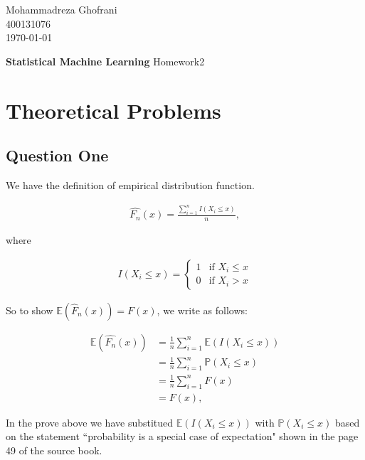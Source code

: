 \documentclass[12pt, a4paper]{book}
\newcommand{\coursetitle}{Statistical Machine Learning}
\newcommand{\doctitle}{Homework2}
\newcommand{\name}{Mohammadreza Ghofrani}
\newcommand{\studentno}{400131076}
\newcommand{\todaydate}{\today}
\begin{document}
\begin{flushright}
    \name \\
    \studentno \\
    \todaydate
\end{flushright}

\vspace*{0.5cm}

\begin{center}
    \huge
    \textbf{\coursetitle}
    \break
    \large
    \doctitle
\end{center}

\thispagestyle{plain}

\section*{Theoretical Problems}

\subsection*{Question One}

We have the definition of empirical distribution function.

\begin{eqnarray*}
    \hat{F_n}(x) = \frac{\sum_{i=1}^n I (X_i \leq x )}{n},
\end{eqnarray*}

where

\begin{eqnarray*}
    I (X_i \leq x) =
    \begin{cases}
        1 & \text{if } X_i \leq x \\
        0 & \text{if } X_i > x
        \end{cases}
\end{eqnarray*}

So to show $\mathbb{E}(\hat{F}_n(x)) = F(x)$, we write as follows:

\begin{align*}
    \mathbb{E}(\hat{F_n}(x)) & = \frac{1}{n} \sum_{i = 1}^n \mathbb{E}(I(X_i \leq x )) \\
     & = \frac{1}{n} \sum_{i = 1}^n \mathbb{P}(X_i \leq x ) \\
     & = \frac{1}{n} \sum_{i = 1}^n F(x) \\
     & = F(x),
\end{align*}

In the prove above we have substitued $\mathbb{E}(I(X_i \leq x))$ with $\mathbb{P}(X_i \leq x)$ based on the
statement ``probability is a special case of expectation" shown in the page 49 of the source book.
\end{document}
